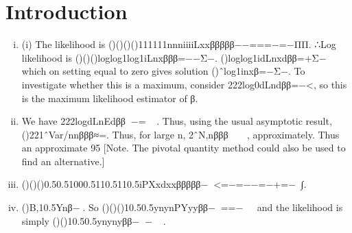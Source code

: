 \documentclass{article}
\author{kobriendublin }
\date{December 2018}
\begin{document}
\section{Introduction}
\begin{enumerate}[(i)]
\item 

(i) The likelihood is ()()()()111111nnniiiiLxxβββββ−−===−=−ΠΠ.
∴Log likelihood is ()()()loglog1log1iLnxβββ=−−Σ−.
()loglog1idLnxdββ=+Σ− which on setting equal to zero gives solution ()ˆlog1inxβ=−Σ−.
To investigate whether this is a maximum, consider 222log0dLndββ=−<, so this is the maximum likelihood estimator of β.
\item We have 222logdLnEdββ−=.
Thus, using the usual asymptotic result, ()221ˆVar/nnβββ≈=.
Thus, for large n, 2ˆN,nβββ, approximately.
Thus an approximate 95%
[Note. The pivotal quantity method could also be used to find an alternative.]
\item ()()()0.50.51000.5110.5110.5iPXxdxxβββββ−<=−=−−=−+=−∫.
\item ()B,10.5Ynβ−.
So ()()()10.50.5ynynPYyyββ−==− and the likelihood is simply
()()10.50.5ynynyββ−−.

\end{enumerate}
\end{document}
